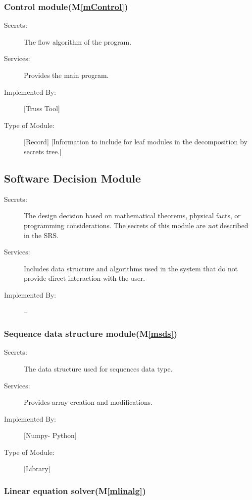 \documentclass[12pt, titlepage]{article}
\newcommand{\mref}[1]{M\ref{#1}}
\begin{document}
\subsubsection{Control module(\mref{mControl})}

\begin{description}
\item[Secrets:]The flow algorithm of the program.
\item[Services:] Provides the main program.
\item[Implemented By:] [Truss Tool]
\item[Type of Module:] [Record]
  [Information to include for leaf modules in the decomposition by secrets tree.]
\end{description}



\subsection{Software Decision Module}

\begin{description}
\item[Secrets:] The design decision based on mathematical theorems, physical
  facts, or programming considerations. The secrets of this module are
  \emph{not} described in the SRS.
\item[Services:] Includes data structure and algorithms used in the system that
  do not provide direct interaction with the user. 
\item[Implemented By:] --
\end{description}
\subsubsection{Sequence data structure module(\mref{msds})}

\begin{description}
\item[Secrets:]The data structure used for sequences data type.
\item[Services:] Provides array creation and modifications.
\item[Implemented By:] [Numpy- Python]
\item[Type of Module:] [Library]
 
\end{description}
\subsubsection{Linear equation solver(\mref{mlinalg})}
\end{document}
